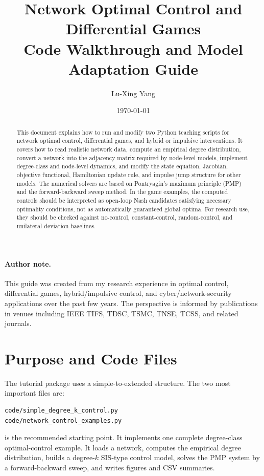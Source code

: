\documentclass[11pt,a4paper]{article}
\title{\bfseries Network Optimal Control and Differential Games\\[2mm]
\large Code Walkthrough and Model Adaptation Guide}
\author{Lu-Xing Yang}
\date{\today}
\DeclareRobustCommand{\code}[1]{\texttt{\detokenize{#1}}}
\begin{document}
\maketitle

\begin{abstract}
This document explains how to run and modify two Python teaching scripts for network optimal control, differential games, and hybrid or impulsive interventions. It covers how to read realistic network data, compute an empirical degree distribution, convert a network into the adjacency matrix required by node-level models, implement degree-class and node-level dynamics, and modify the state equation, Jacobian, objective functional, Hamiltonian update rule, and impulse jump structure for other models. The numerical solvers are based on Pontryagin's maximum principle (PMP) and the forward-backward sweep method. In the game examples, the computed controls should be interpreted as open-loop Nash candidates satisfying necessary optimality conditions, not as automatically guaranteed global optima. For research use, they should be checked against no-control, constant-control, random-control, and unilateral-deviation baselines.
\end{abstract}

\paragraph{Author note.}
This guide was created from my research experience in optimal control, differential games, hybrid/impulsive control, and cyber/network-security applications over the past few years. The perspective is informed by publications in venues including IEEE TIFS, TDSC, TSMC, TNSE, TCSS, and related journals.

\tableofcontents
\newpage

\section{Purpose and Code Files}

The tutorial package uses a simple-to-extended structure. The two most important files are:

\begin{lstlisting}[style=text]
code/simple_degree_k_control.py
code/network_control_examples.py
\end{lstlisting}

\code{simple_degree_k_control.py} is the recommended starting point. It implements one complete degree-class optimal-control example. It loads a network, computes the empirical degree distribution, builds a degree-\(k\) SIS-type control model, solves the PMP system by a forward-backward sweep, and writes figures and CSV summaries.
\end{document}
